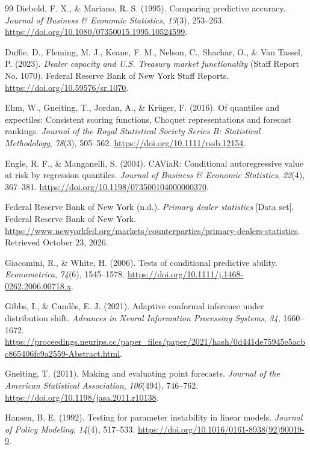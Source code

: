\documentclass[11pt,a4paper]{article}
\begin{document}
\begin{thebibliography}{99}
 Diebold, F. X., \& Mariano, R. S. (1995). Comparing predictive accuracy. \emph{Journal of Business \& Economic Statistics}, \emph{13}(3), 253--263. \url{https://doi.org/10.1080/07350015.1995.10524599}.

 Duffie, D., Fleming, M. J., Keane, F. M., Nelson, C., Shachar, O., \& Van Tassel, P. (2023). \emph{Dealer capacity and U.S. Treasury market functionality} (Staff Report No. 1070). Federal Reserve Bank of New York Staff Reports. \url{https://doi.org/10.59576/sr.1070}.

 Ehm, W., Gneiting, T., Jordan, A., \& Krüger, F. (2016). Of quantiles and expectiles: Consistent scoring functions, Choquet representations and forecast rankings. \emph{Journal of the Royal Statistical Society Series B: Statistical Methodology}, \emph{78}(3), 505--562. \url{https://doi.org/10.1111/rssb.12154}.

 Engle, R. F., \& Manganelli, S. (2004). CAViaR: Conditional autoregressive value at risk by regression quantiles. \emph{Journal of Business \& Economic Statistics}, \emph{22}(4), 367--381. \url{https://doi.org/10.1198/073500104000000370}.

 Federal Reserve Bank of New York (n.d.). \emph{Primary dealer statistics} [Data set]. Federal Reserve Bank of New York. \url{https://www.newyorkfed.org/markets/counterparties/primary-dealers-statistics}. Retrieved October 23, 2026.

 Giacomini, R., \& White, H. (2006). Tests of conditional predictive ability. \emph{Econometrica}, \emph{74}(6), 1545--1578. \url{https://doi.org/10.1111/j.1468-0262.2006.00718.x}.

 Gibbs, I., \& Candès, E. J. (2021). Adaptive conformal inference under distribution shift. \emph{Advances in Neural Information Processing Systems}, \emph{34}, 1660--1672. \url{https://proceedings.neurips.cc/paper_files/paper/2021/hash/0d441de75945e5acbc865406fc9a2559-Abstract.html}.

 Gneiting, T. (2011). Making and evaluating point forecasts. \emph{Journal of the American Statistical Association}, \emph{106}(494), 746--762. \url{https://doi.org/10.1198/jasa.2011.r10138}.

 Hansen, B. E. (1992). Testing for parameter instability in linear models. \emph{Journal of Policy Modeling}, \emph{14}(4), 517--533. \url{https://doi.org/10.1016/0161-8938(92)90019-9}.


\end{thebibliography}
\end{document}
